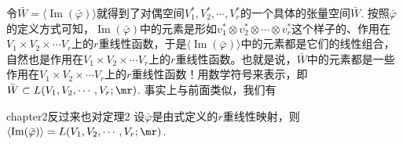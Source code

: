 令$\bar{W}=\langle\operatorname{Im}(\bar{\varphi}) \rangle$就得到了对偶空间$V^{\ast}_{1},V^{\ast}_{2},\cdots,V^{\ast}_{r}$的一个具体的张量空间$\bar{W}$.
按照$\bar{\varphi}$的定义方式可知，$\operatorname{Im}(\bar{\varphi}) $中的元素是形如$v^{\ast}_{1}\otimes v^{\ast}_{2}\otimes\cdots\otimes v^{\ast}_{r}$这个样子的、作用在$V_{1}\times V_{2}\times\cdots V_{r}$上的$r$重线性函数，于是$\langle\operatorname{Im}(\bar{\varphi}) \rangle$中的元素都是它们的线性组合，自然也是作用在$V_{1}\times V_{2}\times\cdots V_{r}$上的$r$重线性函数。也就是说，$\bar{W}$中的元素都是一些作用在$V_{1}\times V_{2}\times\cdots V_{r}$上的$r$重线性函数！用数学符号来表示，即$\bar{W}\subset L(V_{1}, V_{2},\cdots ,V_{r};\mr)$. 事实上与前面类似，我们有
\begin{mythm}{}{chapter2反过来也对定理2}
	设$\bar{\varphi}$是由式定义的$r$重线性映射，则$\langle\operatorname{Im}(\bar{\varphi}) \rangle=L(V_{1}, V_{2},\cdots ,V_{r};\mr)$.
\end{mythm}
